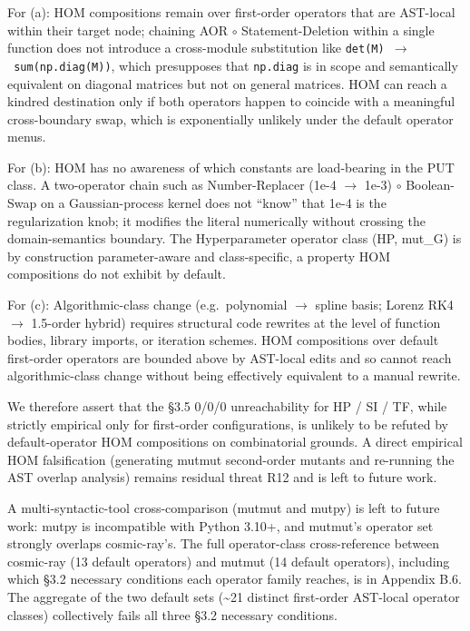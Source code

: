 \documentclass[review,12pt,authoryear]{elsarticle}
\begin{document}
For (a): HOM compositions remain over first-order operators that are
AST-local within their target node; chaining AOR $\circ$ Statement-Deletion
within a single function does not introduce a cross-module substitution
like \texttt{det(M)\ $\to$\ sum(np.diag(M))}, which presupposes that
\texttt{np.diag} is in scope and semantically equivalent on diagonal
matrices but not on general matrices. HOM can reach a kindred
destination only if both operators happen to coincide with a meaningful
cross-boundary swap, which is exponentially unlikely under the default
operator menus.

For (b): HOM has no awareness of which constants are load-bearing in the
PUT class. A two-operator chain such as Number-Replacer (1e-4 $\to$ 1e-3) $\circ$
Boolean-Swap on a Gaussian-process kernel does not ``know'' that 1e-4 is
the regularization knob; it modifies the literal numerically without
crossing the domain-semantics boundary. The Hyperparameter operator
class (HP, mut\_G) is by construction parameter-aware and
class-specific, a property HOM compositions do not exhibit by default.

For (c): Algorithmic-class change (e.g.~polynomial $\to$ spline basis;
Lorenz RK4 $\to$ 1.5-order hybrid) requires structural code rewrites at the
level of function bodies, library imports, or iteration schemes. HOM
compositions over default first-order operators are bounded above by
AST-local edits and so cannot reach algorithmic-class change without
being effectively equivalent to a manual rewrite.

We therefore assert that the §3.5 0/0/0 unreachability for HP / SI / TF,
while strictly empirical only for first-order configurations, is
unlikely to be refuted by default-operator HOM compositions on
combinatorial grounds. A direct empirical HOM falsification (generating
mutmut second-order mutants and re-running the AST overlap analysis)
remains residual threat R12 and is left to future work.

A multi-syntactic-tool cross-comparison (mutmut and mutpy) is left to
future work: mutpy is incompatible with Python 3.10+, and mutmut's operator
set strongly overlaps cosmic-ray's. The full operator-class
cross-reference between cosmic-ray (13 default operators) and mutmut (14
default operators), including which §3.2 necessary conditions each
operator family reaches, is in Appendix B.6. The aggregate of the two
default sets (\textasciitilde21 distinct first-order AST-local operator
classes) collectively fails all three §3.2 necessary conditions.
\end{document}
